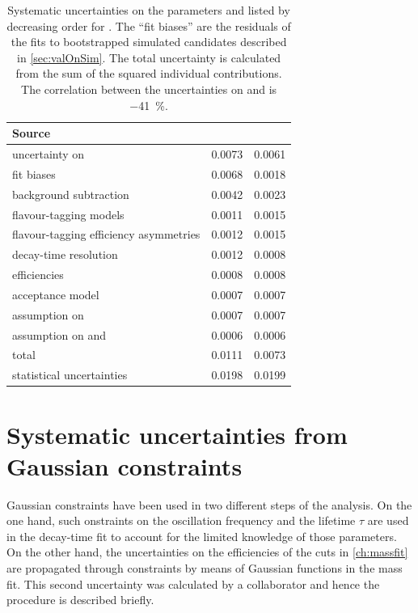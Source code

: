 \begin{table}[tbp]
	\centering
	\caption{Systematic uncertainties on the \CP parameters \Sf and \Sfbar listed by decreasing order for \Sf.
	The \enquote{fit biases} are the residuals of the fits to bootstrapped simulated candidates described in \cref{sec:valOnSim}.
	The total uncertainty is calculated from the sum of the squared individual contributions.
    The correlation between the uncertainties on \Sf and \Sfbar is \SI{-41}{\percent}.}
	\begin{tabular}{lS[table-format=1.4]S[table-format=1.4]}
		\toprule
		Source & \Sf & \Sfbar\\
		\midrule
		uncertainty on \dm 						& 0.0073 & 0.0061 \\
		fit biases 								& 0.0068 & 0.0018 \\
		background subtraction 					& 0.0042 & 0.0023 \\
		flavour-tagging models 					& 0.0011 & 0.0015 \\
		flavour-tagging efficiency asymmetries 	& 0.0012 & 0.0015 \\
		decay-time resolution 					& 0.0012 & 0.0008 \\
		\dllkpi efficiencies 					& 0.0008 & 0.0008 \\
		acceptance model 						& 0.0007 & 0.0007 \\
		assumption on \DG 						& 0.0007 & 0.0007 \\
		assumption on \Cf and \Cfbar 			& 0.0006 & 0.0006 \\
		\midrule
		total 									& 0.0111 & 0.0073 \\
		\midrule
		statistical uncertainties 				& 0.0198 & 0.0199 \\
		\bottomrule
	\end{tabular}
	\label{tab:SystUncertsFull}
\end{table}


\section{Systematic uncertainties from Gaussian constraints}
\label{sec:SystUncertsGauss}

Gaussian constraints have been used in two different steps of the analysis.
On the one hand, such onstraints on the \Bz oscillation frequency \dm and the \Bz lifetime $\tau$ are used in the decay-time fit to account for the limited knowledge of those parameters.
On the other hand, the uncertainties on the efficiencies of the \dllkpi cuts in \cref{ch:massfit} are propagated through constraints by means of Gaussian functions in the mass fit.
This second uncertainty was calculated by a collaborator and hence the procedure is described briefly.

